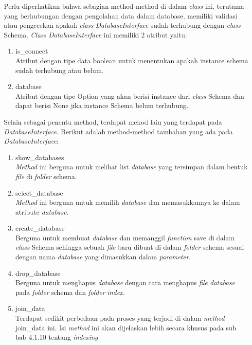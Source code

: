 Perlu diperhatikan bahwa sebagian method-method di dalam \emph{class} ini, terutama
yang berhubungan dengan pengolahan data dalam database, memiliki validasi atau pengecekan apakah \emph{class} \emph{DatabaseInterface} sudah terhubung dengan \emph{class} Schema. \emph{Class} \emph{DatabaseInterface} ini memiliki
2 atribut yaitu:
\begin{enumerate}
	\item is\_connect \\
  Atribut dengan tipe data boolean untuk menentukan apakah instance schema sudah terhubung atau belum.
	
	\item database \\
  Atribut dengan tipe Option yang akan berisi instance dari \emph{class} Schema dan dapat berisi None jika instance Schema belum terhubung.
\end{enumerate}

Selain sebagai penentu method, terdapat mehod lain yang terdapat pada \emph{DatabaseInterface}. Berikut adalah method-method tambahan yang ada pada \emph{DatabaseInterface}:
\begin{enumerate}
	\item show\_databases \\
  \emph{Method} ini berguna untuk melihat list \emph{database} yang tersimpan dalam bentuk \emph{file} di \emph{folder} schema.

	\item select\_database \\
  \emph{Method} ini berguna untuk memilih \emph{database} dan memasukkannya ke dalam atribute \emph{database}.

	\item create\_database \\
  Berguna untuk membuat \emph{database} dan memanggil \emph{function} save di dalam \emph{class} Schema sehingga sebuah \emph{file} baru dibuat di dalam \emph{folder} schema sesuai dengan
  nama \emph{database} yang dimasukkan dalam \emph{parameter}.

	\item drop\_database \\
  Berguna untuk menghapus \emph{database} dengan cara menghapus \emph{file} \emph{database} pada \emph{folder} schema dan \emph{folder} \emph{index}.

	\item join\_data \\
	Terdapat sedikit perbedaan pada proses yang terjadi di dalam \emph{method} join\_data ini. Isi \emph{method} ini akan dijelaskan 
	lebih secara khusus pada sub bab 4.1.10 tentang \emph{indexing}
	
\end{enumerate}

